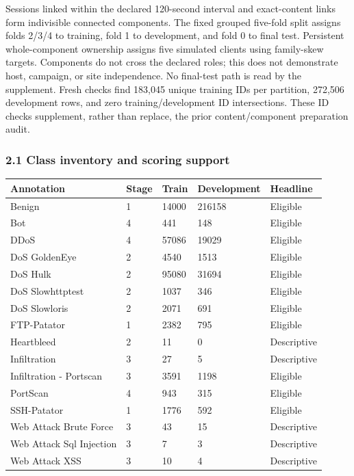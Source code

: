 \documentclass[
  10pt,
]{article}
\begin{document}
Sessions linked within the declared 120-second interval and
exact-content links form indivisible connected components. The fixed
grouped five-fold split assigns folds 2/3/4 to training, fold 1 to
development, and fold 0 to final test. Persistent whole-component
ownership assigns five simulated clients using family-skew targets.
Components do not cross the declared roles; this does not demonstrate
host, campaign, or site independence. No final-test path is read by the
supplement. Fresh checks find 183,045 unique training IDs per partition,
272,506 development rows, and zero training/development ID
intersections. These ID checks supplement, rather than replace, the
prior content/component preparation audit.

\hypertarget{class-inventory-and-scoring-support}{%
\subsubsection{2.1 Class inventory and scoring
support}\label{class-inventory-and-scoring-support}}

\begin{longtable}[]{@{}lllll@{}}
\toprule
Annotation & Stage & Train & Development & Headline \\
\midrule
\endhead
Benign & 1 & 14000 & 216158 & Eligible \\
Bot & 4 & 441 & 148 & Eligible \\
DDoS & 4 & 57086 & 19029 & Eligible \\
DoS GoldenEye & 2 & 4540 & 1513 & Eligible \\
DoS Hulk & 2 & 95080 & 31694 & Eligible \\
DoS Slowhttptest & 2 & 1037 & 346 & Eligible \\
DoS Slowloris & 2 & 2071 & 691 & Eligible \\
FTP-Patator & 1 & 2382 & 795 & Eligible \\
Heartbleed & 2 & 11 & 0 & Descriptive \\
Infiltration & 3 & 27 & 5 & Descriptive \\
Infiltration - Portscan & 3 & 3591 & 1198 & Eligible \\
PortScan & 4 & 943 & 315 & Eligible \\
SSH-Patator & 1 & 1776 & 592 & Eligible \\
Web Attack Brute Force & 3 & 43 & 15 & Descriptive \\
Web Attack Sql Injection & 3 & 7 & 3 & Descriptive \\
Web Attack XSS & 3 & 10 & 4 & Descriptive \\
\bottomrule
\end{longtable}
\end{document}

